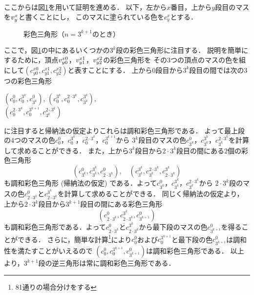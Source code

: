 \begin{itemize}
  ここからは図\ref{fig:ind_steps}を用いて証明を進める．
  以下，左から$x$番目，上から$y$段目のマスを$v^x_y$と書くことにし，
  このマスに塗られている色を$c^x_y$とする．
\begin{figure}[h]
    \centering
    
    \caption{彩色三角形（$n=3^{k+1}$のとき）}
    \label{fig:ind_steps}
\end{figure}
ここで，図\ref{fig:ind_steps}の中にあるいくつかの$3^k$段の彩色三角形に注目する．
説明を簡単にするために，頂点$v^{x0}_{y0}$，$v^{x1}_{y1}$，$v^{x2}_{y2}$の彩色三角形を
その$3$つの頂点のマスの色を組にして$(c^{x0}_{y0},c^{x1}_{y1},c^{x2}_{y2})$と表すことにする．
上から$0$段目から$3^{k}$段目の間では次の$3$つの彩色三角形
\begin{center}
$\left(c^{0}_{0},c^{3^{k}}_{0},c^{0}_{3^{k}}\right)$,
\quad
$\left(c^{3^{k}}_{0},c^{2\cdot3^{k}}_{0},c^{3^{k}}_{3^{k}}\right)$,
\\
$\left(c^{2\cdot3^{k}}_{0},c^{3^{k+1}}_{0},c^{2\cdot3^{k}}_{3^{k}}\right)$
\end{center}
に注目すると帰納法の仮定よりこれらは調和彩色三角形である．
よって最上段の$4$つのマスの色$c^{0}_{0}$，$c^{3^k}_{0}$，$c^{2\cdot 3^k}_{0}$，$c^{3^{k+1}}_{0}$から
$3^k$段目のマスの色$c^{0}_{3^k}$，$c^{3^k}_{3^k}$，$c^{2\cdot 3^k}_{3^k}$を計算して求めることができる．
また，上から$3^{k}$段目から$2\cdot3^{k}$段目の間にある$2$個の彩色三角形
\[
\left(c^{0}_{3^{k}},c^{3^{k}}_{3^{k}},c^{0}_{2\cdot3^{k}}\right),
\quad
\left(c^{3^{k}}_{3^{k}},c^{2\cdot3^{k}}_{3^{k}},c^{3^{k}}_{2\cdot3^{k}}\right)
\]
も調和彩色三角形 (帰納法の仮定) である．よって$c^{0}_{3^k}$，$c^{3^k}_{3^k}$，$c^{2\cdot 3^k}_{3^k}$から
$2\cdot 3^k$段のマスの色$c^{0}_{2\cdot 3^k}$と$c^{3^k}_{2\cdot 3^k}$を計算して求めることができる．
同じく帰納法の仮定より，上から$2\cdot3^{k}$段目から$3^{k+1}$段目の間にある彩色三角形
\[
\left(c^{0}_{2\cdot3^{k}},c^{3^{k}}_{2\cdot3^{k}},c^{0}_{3^{k+1}}\right)
\]
も調和彩色三角形である．よって$c^{0}_{2\cdot 3^k}$と$c^{3^k}_{2\cdot 3^k}$から最下段のマスの色$c^{0}_{3^{k+1}}$を得ることができる．
さらに，簡単な計算\footnote{81通りの場合分けをする}により$c^0_0$および$c^{3^{k+1}}_0$と最下段の色$c^0_{3^{k+1}}$は調和性を満たすことがいえるので
$(c^{0}_{0},c^{3^{k+1}}_{0},c^{0}_{3^{k+1}})$は調和彩色三角形である．
以上より，$3^{k+1}$段の逆三角形は常に調和彩色三角形である．
\end{itemize}
